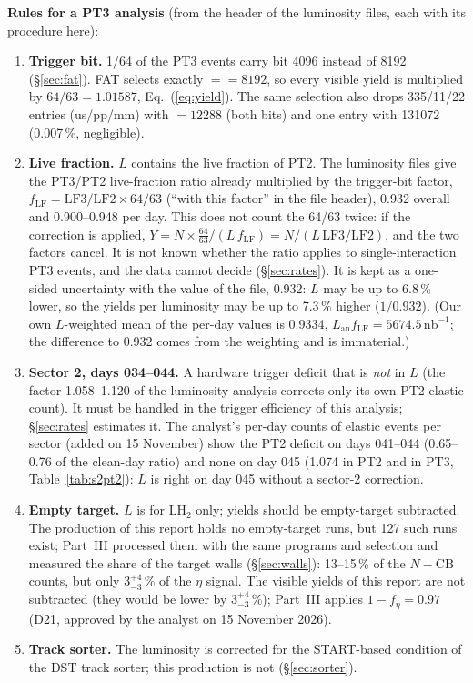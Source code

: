 \documentclass[11pt,a4paper]{article}
\newcommand{\nbinv}{\ensuremath{\mathrm{nb}^{-1}}\xspace}
\newcommand{\code}[1]{\texttt{\detokenize{#1}}}
\newcommand{\Lan}{\ensuremath{L_{\mathrm{an}}}\xspace}
\begin{document}
\textbf{Rules for a PT3 analysis} (from the header of the luminosity files, each with its procedure here):
\begin{enumerate}
\item \textbf{Trigger bit.} 1/64 of the PT3 events carry bit 4096 instead of 8192 (\S\ref{sec:fat}). FAT selects
      exactly \code{trigbit} $==8192$, so every visible yield is multiplied by $64/63=1.01587$, Eq.~(\ref{eq:yield}).
      The same selection also drops 335/11/22 entries (us/pp/mm) with \code{trigbit} $=12288$ (both bits) and one entry with 131072
      (0.007\,\%, negligible).
\item \textbf{Live fraction.} $L$ contains the live fraction of PT2. The luminosity files give the PT3/PT2
      live-fraction ratio already multiplied by the trigger-bit factor, $f_{\mathrm{LF}}=\mathrm{LF3}/\mathrm{LF2}\times64/63$
      (``with this factor'' in the file header), 0.932 overall and 0.900--0.948 per day. This does not count
      the 64/63 twice: if the correction is applied, $Y=N\times\frac{64}{63}/(L\,f_{\mathrm{LF}})=N/(L\,\mathrm{LF3}/\mathrm{LF2})$,
      and the two factors cancel. It is not known whether the ratio applies to single-interaction PT3 events,
      and the data cannot decide (\S\ref{sec:rates}). It is kept as a one-sided uncertainty with the value of the
      file, 0.932: $L$ may be up to 6.8\,\% lower, so the yields per luminosity may be up to 7.3\,\% higher
      ($1/0.932$). (Our own $L$-weighted mean of the per-day values is 0.9334, $\Lan f_{\mathrm{LF}}=5674.5\,\nbinv$;
      the difference to 0.932 comes from the weighting and is immaterial.)
\item \textbf{Sector 2, days 034--044.} A hardware trigger deficit that is \emph{not} in $L$ (the factor
      1.058--1.120 of the luminosity analysis corrects only its own PT2 elastic count). It must be handled
      in the trigger efficiency of this analysis; \S\ref{sec:rates} estimates it. The analyst's per-day counts of elastic events per sector
      (added on 15 November) show the PT2 deficit on days 041--044 (0.65--0.76 of the clean-day ratio) and none on day 045 (1.074 in PT2 and in
      PT3, Table~\ref{tab:s2pt2}): $L$ is right on day 045 without a sector-2 correction.
\item \textbf{Empty target.} $L$ is for LH$_2$ only; yields should be empty-target subtracted. The production of this
      report holds no empty-target runs, but 127 such runs exist; Part~III processed them with the same programs and
      selection and measured the share of the target walls (\S\ref{sec:walls}): 13--15\,\% of the $N-\mathrm{CB}$ counts,
      but only $3^{+4}_{-3}$\,\% of the $\eta$ signal. The visible yields of this report are not subtracted (they would be lower by
      $3^{+4}_{-3}$\,\%); Part~III applies $1-f_\eta=0.97$ (D21, approved by the analyst on 15 November 2026).
\item \textbf{Track sorter.} The luminosity is corrected for the START-based condition of the DST track
      sorter; this production is not (\S\ref{sec:sorter}).
\end{enumerate}
\end{document}
